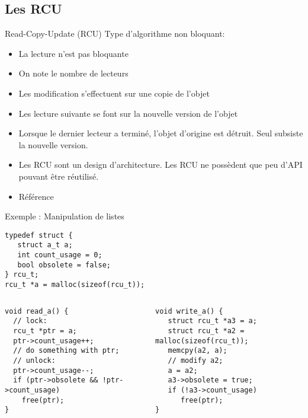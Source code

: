\subsection{Les RCU}

\begin{frame}[fragile=singleslide]{Read-Copy-Update (RCU)}
  Type d'algorithme non bloquant:
  \begin{itemize}
  \item La lecture n'est pas bloquante
  \item On note le nombre de lecteurs
  \item Les modification s'effectuent sur une copie de l'objet
  \item  Les lecture  suivante  se  font sur  la  nouvelle version  de
    l'objet
  \item Lorsque  le dernier lecteur  a terminé, l'objet  d'origine est
    détruit. Seul subsiste la nouvelle version.
  \item Les  RCU sont un  design d'architecture. Les RCU  ne possèdent
    que peu d'API pouvant être réutilisé.
  \item        Référence        
  \end{itemize}
\end{frame}

\begin{frame}[fragile]{Exemple : Manipulation de listes}
  \begin{center}
    \begin{lstlisting}[basicstyle=\ttfamily\scriptsize\color{colBasic},commentstyle=\scriptsize\itshape\color{colComments},numbers=none]
typedef struct {
   struct a_t a;
   int count_usage = 0;
   bool obsolete = false;
} rcu_t;
rcu_t *a = malloc(sizeof(rcu_t));
    \end{lstlisting}
  \end{center}
  \begin{columns}
    \begin{column}{5cm}
      \begin{lstlisting}[basicstyle=\ttfamily\scriptsize\color{colBasic},commentstyle=\scriptsize\itshape\color{colComments},numbers=none]
void read_a() {
  // lock:
  rcu_t *ptr = a;
  ptr->count_usage++;
  // do something with ptr;
  // unlock:
  ptr->count_usage--;
  if (ptr->obsolete && !ptr->count_usage)
    free(ptr);
}
      \end{lstlisting}
    \end{column}
    \begin{column}{5cm}
      \begin{lstlisting}[basicstyle=\ttfamily\scriptsize\color{colBasic},commentstyle=\scriptsize\itshape\color{colComments},numbers=none]
void write_a() {
   struct rcu_t *a3 = a;
   struct rcu_t *a2 = malloc(sizeof(rcu_t));
   memcpy(a2, a);
   // modify a2;
   a = a2;
   a3->obsolete = true;
   if (!a3->count_usage)
      free(ptr);
}
      \end{lstlisting}
    \end{column}
  \end{columns}
\end{frame}

